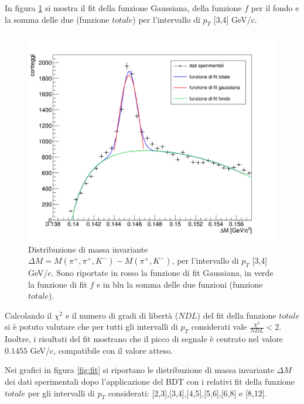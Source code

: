 In figura \ref{fig:fit_3_4_p} si mostra il fit della funzione Gaussiana, della funzione $f$ per il fondo e la somma delle due (funzione $totale$) per l'intervallo di $p_T$ [3,4] GeV/c.
    \begin{figure}[htpb] 
        \centering
        \includegraphics[width=0.8\linewidth]{AnalisiDati/fit_3_4.png}
        \caption{Distribuzione di massa invariante $\Delta M = M(\pi^+,\pi^+,K^-) - M(\pi^+,K^-)$, per l'intervallo di $p_T$ [3,4] GeV/c. Sono riportate in rosso la funzione di fit Gaussiana, in verde la funzione di fit $f$ e in blu la somma delle due funzioni (funzione $totale$). }
        \label{fig:fit_3_4_p}
    \end{figure}

Calcolando il $\chi^2$ e il numero di gradi di libert\`a ($NDL$) del fit della funzione $totale$ si \`e potuto valutare che per tutti gli intervalli di $p_T$ considerati vale $\frac{\chi^2}{NDL} < 2$. Inoltre, i risultati del fit mostrano che il picco di segnale \`e centrato nel valore $0.1455$ GeV/c, compatibile con il valore atteso. 

Nei grafici in figura \ref{fig:fit} si riportano le distribuzione di massa invariante $\Delta M$ dei dati sperimentali dopo l'applicazione del BDT con i relativi fit della funzione $totale$ per gli intervalli di $p_T$ considerati: [2,3],[3,4],[4,5],[5,6],[6,8] e [8,12].


